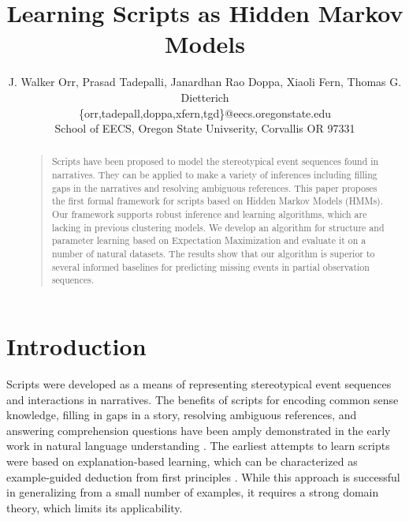 \documentclass[letterpaper]{article}
\begin{document}
\title{Learning Scripts as Hidden Markov Models}
\author{J. Walker Orr, Prasad Tadepalli, Janardhan Rao Doppa, Xiaoli Fern, Thomas G. Dietterich \\ \{orr,tadepall,doppa,xfern,tgd\}@eecs.oregonstate.edu \\School of EECS, Oregon State Univserity, Corvallis OR 97331}
\maketitle
\begin{abstract}
\begin{quote}
Scripts have been proposed to model the stereotypical event sequences found in
narratives. They can be applied to make a variety of inferences including filling
gaps in the narratives and resolving ambiguous references. This paper proposes
the first formal framework for scripts based on Hidden Markov Models (HMMs). Our
framework supports robust inference and learning algorithms, which are lacking in
previous clustering models. We develop an algorithm for structure and parameter
learning based on Expectation Maximization and evaluate it on a number of natural
datasets. The results show that our algorithm is superior to
several informed baselines for predicting missing
events in partial observation sequences.

\end{quote}
\end{abstract}

\section{Introduction}
Scripts were developed as a means of representing stereotypical event sequences and interactions in narratives. %
The benefits of scripts for encoding common sense knowledge,
filling in gaps in a story, resolving
ambiguous references, and answering comprehension
questions have been amply demonstrated in the early work
in natural language understanding \cite{schank1977scripts}.
The earliest attempts to learn scripts were based on
explanation-based learning, which can be characterized as example-guided deduction from first principles \cite{dejong1981,dejong1986EBL}. %
While this approach is successful in generalizing from a small number of examples, it requires a strong domain theory, which limits its applicability.
\end{document}
